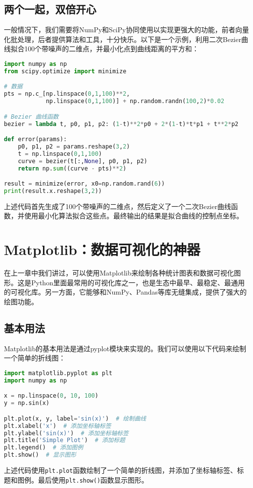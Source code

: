 \documentclass[../main.tex]{subfiles}
\begin{document}
\subsection{两个一起，双倍开心}

一般情况下，我们需要将NumPy和SciPy协同使用以实现更强大的功能，前者向量化批处理，后者提供算法和工具，十分快乐。以下是一个示例，利用二次Bezier曲线拟合100个带噪声的二维点，并最小化点到曲线距离的平方和：
\begin{lstlisting}[language=python]
import numpy as np
from scipy.optimize import minimize

# 数据
pts = np.c_[np.linspace(0,1,100)**2,
            np.linspace(0,1,100)] + np.random.randn(100,2)*0.02

# Bezier 曲线函数
bezier = lambda t, p0, p1, p2: (1-t)**2*p0 + 2*(1-t)*t*p1 + t**2*p2

def error(params):
    p0, p1, p2 = params.reshape(3,2)
    t = np.linspace(0,1,100)
    curve = bezier(t[:,None], p0, p1, p2)
    return np.sum((curve - pts)**2)

result = minimize(error, x0=np.random.rand(6))
print(result.x.reshape(3,2))
\end{lstlisting}
上述代码首先生成了100个带噪声的二维点，然后定义了一个二次Bezier曲线函数，并使用最小化算法拟合这些点。最终输出的结果是拟合曲线的控制点坐标。

\section{Matplotlib：数据可视化的神器}

在上一章中我们讲过，可以使用Matplotlib来绘制各种统计图表和数据可视化图形。这是Python里面最常用的可视化库之一，也是生态中最早、最稳定、最通用的可视化库。另一方面，它能够和NumPy、Pandas等库无缝集成，提供了强大的绘图功能。

\subsection{基本用法}

Matplotlib的基本用法是通过pyplot模块来实现的。我们可以使用以下代码来绘制一个简单的折线图：
\begin{lstlisting}[language=python]
import matplotlib.pyplot as plt
import numpy as np

x = np.linspace(0, 10, 100)
y = np.sin(x)

plt.plot(x, y, label='sin(x)')  # 绘制曲线
plt.xlabel('x')  # 添加坐标轴标签
plt.ylabel('sin(x)')  # 添加坐标轴标签
plt.title('Simple Plot')  # 添加标题
plt.legend()  # 添加图例
plt.show()  # 显示图形
\end{lstlisting}
上述代码使用\texttt{plt.plot}函数绘制了一个简单的折线图，并添加了坐标轴标签、标题和图例。最后使用\texttt{plt.show()}函数显示图形。
\end{document}

